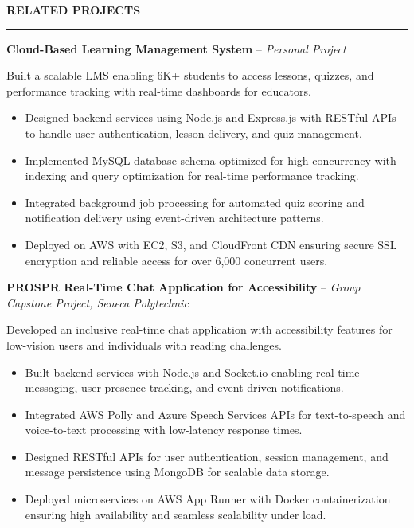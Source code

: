 \documentclass[10pt,letterpaper]{article}
\begin{document}
\vspace{6pt}

\textbf{RELATED PROJECTS}\\[-8pt]
\noindent\rule{\textwidth}{1pt}

\vspace{-2pt}

\textbf{Cloud-Based Learning Management System} -- \emph{Personal Project}

\vspace{-1pt}

Built a scalable LMS enabling 6K+ students to access lessons, quizzes, and performance tracking with real-time dashboards for educators.
\vspace{-1pt}
\begin{itemize}
\item Designed backend services using Node.js and Express.js with RESTful APIs to handle user authentication, lesson delivery, and quiz management.
\item Implemented MySQL database schema optimized for high concurrency with indexing and query optimization for real-time performance tracking.
\item Integrated background job processing for automated quiz scoring and notification delivery using event-driven architecture patterns.
\item Deployed on AWS with EC2, S3, and CloudFront CDN ensuring secure SSL encryption and reliable access for over 6,000 concurrent users.
\end{itemize}

\textbf{PROSPR  Real-Time Chat Application for Accessibility} -- \emph{Group Capstone Project, Seneca Polytechnic}

\vspace{-1pt}

Developed an inclusive real-time chat application with accessibility features for low-vision users and individuals with reading challenges.
\vspace{-1pt}
\begin{itemize}
\item Built backend services with Node.js and Socket.io enabling real-time messaging, user presence tracking, and event-driven notifications.
\item Integrated AWS Polly and Azure Speech Services APIs for text-to-speech and voice-to-text processing with low-latency response times.
\item Designed RESTful APIs for user authentication, session management, and message persistence using MongoDB for scalable data storage.
\item Deployed microservices on AWS App Runner with Docker containerization ensuring high availability and seamless scalability under load.
\end{itemize}
\end{document}
